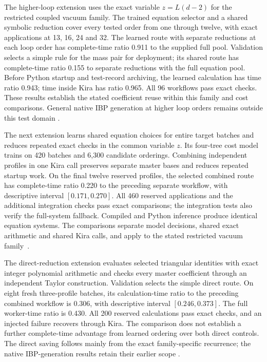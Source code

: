 \documentclass[11pt,a4paper]{article}
\begin{document}
The higher-loop extension uses the exact variable \(z=L(d-2)\) for the
restricted coupled vacuum family. The trained equation selector and a
shared symbolic reduction cover every tested order from one through
twelve, with exact applications at 13, 16, 24 and 32.
The learned route with separate reductions at each loop order has complete-time ratio
0.911 to the supplied full pool. Validation selects a
simple rule for the mass pair for deployment; its shared route has complete-time
ratio 0.155 to separate reductions with the full equation pool.
Before Python startup and test-record archiving, the learned calculation
has time ratio 0.943; time inside Kira has ratio
0.965. All 96 workflows pass exact checks. These results establish the stated
coefficient reuse within this family and cost comparisons. General
native IBP generation at higher loop orders remains outside this test domain
\cite{KiraHigherLoopData}.

The next extension learns shared equation choices for entire target batches
and reduces repeated exact checks in the common variable \(z\). Its
four-tree cost model trains on 420 batches and 6,300 candidate orderings.
Combining independent profiles in one Kira call preserves separate master
bases and reduces repeated startup work. On the final twelve reserved
profiles, the selected combined route has complete-time ratio 0.220
to the preceding separate workflow, with descriptive interval
\([0.171,0.270]\). All 460 reserved applications and the additional
integration checks pass exact comparisons; the integration tests also
verify the full-system fallback. Compiled and Python inference produce
identical equation systems. The comparisons separate model decisions,
shared exact arithmetic and shared Kira calls, and apply to the stated
restricted vacuum family~\cite{KiraBatchReuseData}.

The direct-reduction extension evaluates selected triangular identities with exact
integer polynomial arithmetic and checks every master coefficient through
an independent Taylor construction. Validation selects the simple direct route.
On eight fresh three-profile batches, its calculation-time ratio to the
preceding combined workflow is 0.306, with descriptive interval
\([0.246,0.373]\). The full worker-time ratio is 0.430.
All 200 reserved calculations pass exact checks, and an injected failure
recovers through Kira. The comparison does not establish a further complete-time advantage from learned ordering over both direct controls.
The direct saving follows mainly from the exact family-specific recurrence;
the native IBP-generation results retain their earlier scope
\cite{KiraPreReductionData}.
\end{document}
